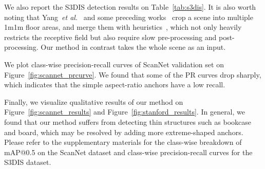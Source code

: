 \documentclass[runningheads]{llncs}
\newcommand{\etal}{\textit{et al.}}
\begin{document}
We also report the S3DIS detection results on Table~\ref{tab:s3dis}. It is also worth noting that Yang~\etal~\cite{yang2019learning} and some preceding works~\cite{wang2018sgpn,wang2019associatively} crop a scene into multiple 1m1m floor areas, and merge them with heuristics~\cite{wang2018sgpn}, which not only heavily restricts the receptive field but also require slow pre-processing and post-processing. Our method in contrast takes the whole scene as an input.

We plot class-wise precision-recall curves of ScanNet validation set on Figure~\ref{fig:scannet_prcurve}. We found that some of the PR curves drop sharply, which indicates that the simple aspect-ratio anchors have a low recall.




Finally, we visualize qualitative results of our method on Figure~\ref{fig:scannet_results} and Figure~\ref{fig:stanford_results}. In general, we found that our method suffers from detecting thin structures such as bookcase and board, which may be resolved by adding more extreme-shaped anchors. 
Please refer to the supplementary materials for the class-wise breakdown of mAP@0.5 on the ScanNet dataset and class-wise precision-recall curves for the S3DIS dataset.
\end{document}
